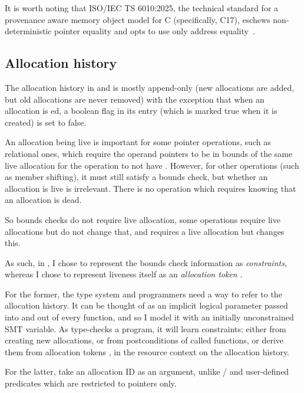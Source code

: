 It is worth noting that ISO/IEC TS 6010:2025, the technical standard for a
provenance aware memory object model for C (specifically, C17), eschews
non-deterministic pointer equality and opts to use only address
equality~.

\subsection{Allocation history}\label{subsec:alloc-history}

The allocation history in  and  is mostly append-only
(new allocations are added, but old allocations are never removed) with the
exception that when an allocation is ed, a boolean flag in its
entry (which is marked true when it is created) is set to false.

An allocation being live is important for some pointer operations, such as
relational ones, which require the operand pointers to be in bounds of the same
live allocation for the operation to not have . However, for other
operations (such as member shifting), it must still satisfy a bounds check, but
whether an allocation is live is irrelevant. There is no operation which
requires knowing that an allocation is dead.

So bounds checks do not require live allocation, some operations require
live allocations but do not change that, and  requires
a live allocation but changes this.

As such, in , I chose to represent the bounds check information as
\emph{constraints}, whereas I chose to represent liveness itself as an
\emph{allocation token} .

For the former, the type system and programmers need a way to refer to the
allocation history. It can be thought of as an implicit logical parameter
passed into and out of every function, and so I model it with an initially
unconstrained SMT variable. As  type-checks a  program, it
will learn constraints: either from creating new allocations, or from
postconditions of called functions, or derive them from allocation tokens
, in the resource context on the allocation history.

For the latter,  take an allocation ID as an argument,
unlike / and user-defined predicates
which are restricted to pointers only.

